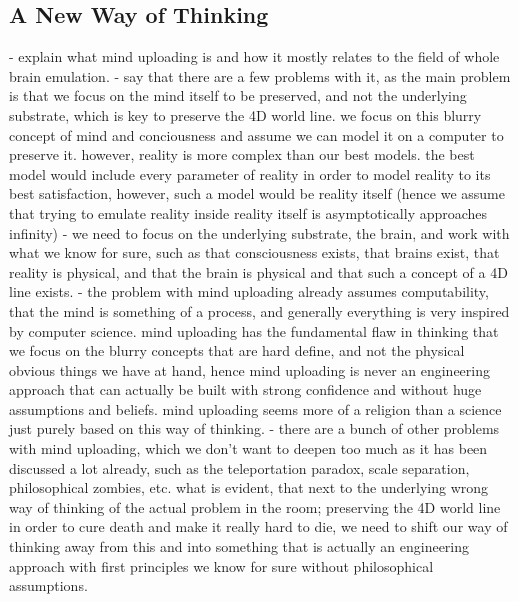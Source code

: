 \documentclass[10pt]{article}
\begin{document}
\begin{sloppypar}
  \subsection{A New Way of Thinking}
  \label{sec:new-thinking}


  - explain what mind uploading is and how it mostly relates to the field of whole brain emulation.
  - say that there are a few problems with it, as the main problem is that we focus on the mind itself to be preserved, and not the underlying substrate, which is key to preserve the 4D world line. we focus on this blurry concept of mind and conciousness and assume we can model it on a computer to preserve it. however, reality is more complex than our best models. the best model would include every parameter of reality in order to model reality to its best satisfaction, however, such a model would be reality itself (hence we assume that trying to emulate reality inside reality itself is asymptotically approaches infinity)
  - we need to focus on the underlying substrate, the brain, and work with what we know for sure, such as that consciousness exists, that brains exist, that reality is physical, and that the brain is physical and that such a concept of a 4D line exists.
  - the problem with mind uploading already assumes computability, that the mind is something of a process, and generally everything is very inspired by computer science. mind uploading has the fundamental flaw in thinking that we focus on the blurry concepts that are hard define, and not the physical obvious things we have at hand, hence mind uploading is never an engineering approach that can actually be built with strong confidence and without huge assumptions and beliefs. mind uploading seems more of a religion than a science just purely based on this way of thinking.
  - there are a bunch of other problems with mind uploading, which we don't want to deepen too much as it has been discussed a lot already, such as the teleportation paradox, scale separation, philosophical zombies, etc. what is evident, that next to the underlying wrong way of thinking of the actual problem in the room; preserving the 4D world line in order to cure death and make it really hard to die, we need to shift our way of thinking away from this and into something that is actually an engineering approach with first principles we know for sure without philosophical assumptions.


\end{sloppypar}
\end{document}
